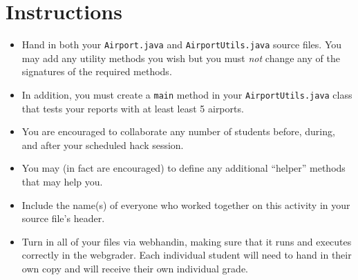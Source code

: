 \documentclass[12pt]{scrartcl}
\begin{document}
\section*{Instructions}

\begin{itemize}

  \item Hand in both your \texttt{Airport.java} and 
  \texttt{AirportUtils.java} source files.  You may add any 
  utility methods you wish but you must \emph{not} change any of the 
  signatures of the required methods.
  
  \item In addition, you must create a \texttt{main} 
  method in your \texttt{AirportUtils.java} class that
  tests your reports with at least least 5 airports. 
  
  \item You are encouraged to collaborate any number of students 
  before, during, and after your scheduled hack session.  

  \item You may (in fact are encouraged) to define any additional
  ``helper'' methods that may help you.

  \item Include the name(s) of everyone who worked together on
  this activity in your source file's header.

  \item Turn in all of your files via webhandin, making sure that 
  it runs and executes correctly in the webgrader.  Each individual 
  student will need to hand in their own copy and will receive 
  their own individual grade.
\end{itemize}  
\end{document}
